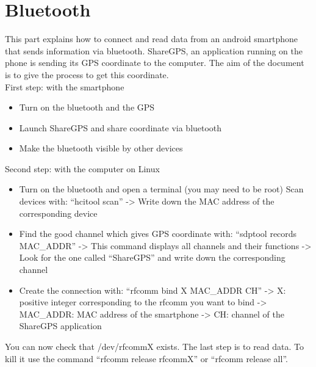 \section{Bluetooth}

This part explains how to connect and read data from an android smartphone that sends information via bluetooth. ShareGPS, an application running on the phone is sending its GPS coordinate to the computer. The aim of the document is to give the process to get this coordinate.\\

First step: with the smartphone\\

\begin{itemize}
 \item Turn on the bluetooth and the GPS
 \item Launch ShareGPS and share coordinate via bluetooth
 \item Make the bluetooth visible by other devices
\end{itemize}

Second step: with the computer on Linux\\

\begin{itemize}
   \item  Turn on the bluetooth and open a terminal (you may need to be root)
   Scan devices with: ``hcitool scan''
   -> Write down the MAC address of the corresponding device
   \item Find the good channel which gives GPS coordinate with: ``sdptool records MAC\_ADDR''
   -> This command displays all channels and their functions
   -> Look for the one called ``ShareGPS'' and write down the corresponding channel
   \item Create the connection with: ``rfcomm bind X MAC\_ADDR CH''
    -> X: positive integer corresponding to the rfcomm you want to bind
    -> MAC\_ADDR: MAC address of the smartphone
    -> CH: channel of the ShareGPS application
\end{itemize}

You can now check that /dev/rfcommX exists. The last step is to read data.
To kill it use the command ``rfcomm release rfcommX'' or ``rfcomm release all''.\\

